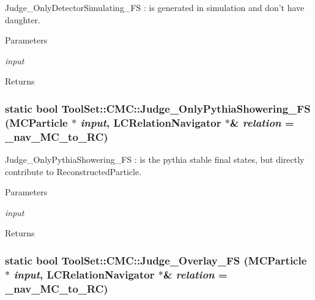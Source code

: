 Judge\_\-OnlyDetectorSimulating\_\-FS : is generated in simulation and don't have daughter. 
\begin{DoxyParams}{Parameters}
\item[{\em input}]\end{DoxyParams}
\begin{DoxyReturn}{Returns}

\end{DoxyReturn}
\hypertarget{classToolSet_1_1CMC_a839156529c555e8d0484286295288604}{
\subsubsection[{Judge\_\-OnlyPythiaShowering\_\-FS}]{\setlength{\rightskip}{0pt plus 5cm}static bool ToolSet::CMC::Judge\_\-OnlyPythiaShowering\_\-FS (MCParticle $\ast$ {\em input}, \/  LCRelationNavigator $\ast$\& {\em relation} = {\ttfamily \_\-nav\_\-MC\_\-to\_\-RC})}}
\label{classToolSet_1_1CMC_a839156529c555e8d0484286295288604}


Judge\_\-OnlyPythiaShowering\_\-FS : is the pythia stable final states, but directly contribute to ReconstructedParticle. 
\begin{DoxyParams}{Parameters}
\item[{\em input}]\end{DoxyParams}
\begin{DoxyReturn}{Returns}

\end{DoxyReturn}
\hypertarget{classToolSet_1_1CMC_a7230e73142fa3a3a5b2952f11556022c}{
\subsubsection[{Judge\_\-Overlay\_\-FS}]{\setlength{\rightskip}{0pt plus 5cm}static bool ToolSet::CMC::Judge\_\-Overlay\_\-FS (MCParticle $\ast$ {\em input}, \/  LCRelationNavigator $\ast$\& {\em relation} = {\ttfamily \_\-nav\_\-MC\_\-to\_\-RC})}}
\label{classToolSet_1_1CMC_a7230e73142fa3a3a5b2952f11556022c}



